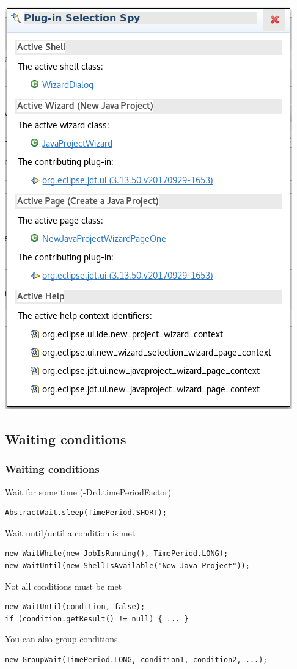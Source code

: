 \documentclass{beamer}
\begin{document}
\begin{frame}[fragile]
\begin{center}
\includegraphics[width=\textwidth,height=0.8\textheight,keepaspectratio]{plugin_spy.png}
\end{center}
\end{frame}

\subsection{Waiting conditions}
\begin{frame}[fragile]
\frametitle{Waiting conditions}
Wait for some time (-Drd.timePeriodFactor)
\begin{lstlisting}
AbstractWait.sleep(TimePeriod.SHORT);
\end{lstlisting}
Wait until/until a condition is met
\begin{lstlisting}
new WaitWhile(new JobIsRunning(), TimePeriod.LONG);
new WaitUntil(new ShellIsAvailable("New Java Project"));
\end{lstlisting}
Not all conditions must be met
\begin{lstlisting}
new WaitUntil(condition, false);
if (condition.getResult() != null) { ... }
\end{lstlisting}
You can also group conditions
\begin{lstlisting}
new GroupWait(TimePeriod.LONG, condition1, condition2, ...);
\end{lstlisting}
\end{frame}
\end{document}
